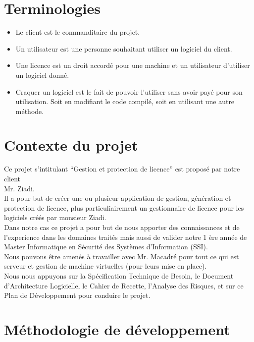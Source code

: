 \chapter{Terminologies}

\begin{itemize}
	\item Le client est le commanditaire du projet.
	\item Un utilisateur est une personne souhaitant utiliser un logiciel du client. 
	\item Une licence est un droit accordé pour une machine et un utilisateur d'utiliser un logiciel donné.
	\item Craquer un logiciel est le fait de pouvoir l'utiliser sans avoir payé pour son utilisation. Soit en modifiant le code compilé, soit en utilisant une autre méthode. 
\end{itemize}

\chapter{Contexte du projet}

Ce projet s’intitulant “Gestion et protection de licence” est proposé par notre client \\Mr.
Ziadi.\\\newline Il a pour but de créer une ou plusieur application de gestion, génération et protection 
de licence, plus particuliairement un gestionnaire de licence pour les logiciels créés par monsieur Ziadi.
\\ \newline Dans notre cas ce projet a pour but de nous apporter des connaissances et de l'experience dans les domaines traités
 mais aussi de valider notre 1 ère année de Master Informatique en Sécurité des Systèmes d’Information (SSI).\\ \newline
Nous pouvons être amenés à travailler avec Mr. Macadré pour tout ce qui est
serveur et gestion de machine virtuelles (pour leurs mise en place).\\ Nous
nous appuyons sur la Spécification Technique de Besoin, le Document d'Architecture
Logicielle, le Cahier de Recette, l’Analyse des Risques, et sur ce Plan de Développement
pour conduire le projet.

\chapter{Méthodologie de développement}

